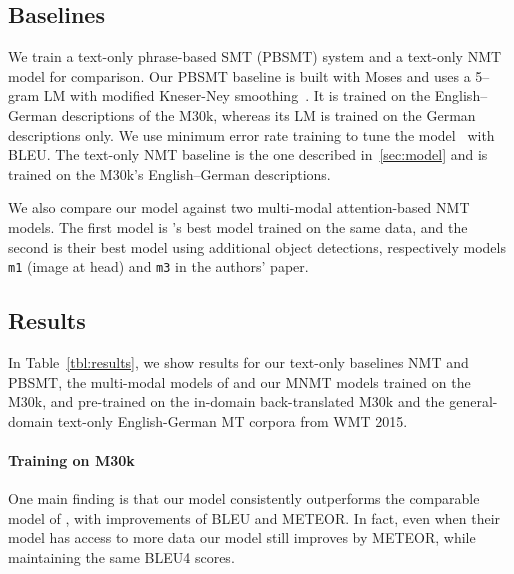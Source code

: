 \documentclass[11pt]{article}
\begin{document}
\subsection{Baselines}\label{sec:baselines}

We train a text-only phrase-based SMT (PBSMT) system and a text-only NMT model for comparison.
Our PBSMT baseline is built with Moses and uses a 5--gram LM with modified Kneser-Ney smoothing~\cite{KneserNey1995}.
It is trained on the English--German descriptions of the M30k, whereas its LM is trained on the German descriptions only.
We use minimum error rate training to tune the model~\cite{Och2003} with BLEU.
The text-only NMT baseline is the one described in~\cref{sec:model} and is trained on the M30k's English--German descriptions.

We also compare our model against two multi-modal attention-based NMT models.
The first model is 's best model trained on the same data, and the second is their best model using additional object detections, respectively models \texttt{m1} (image at head) and \texttt{m3} in the authors' paper.



\subsection{Results}
\label{sec:results}

In Table~\ref{tbl:results}, we show results for our text-only baselines NMT and PBSMT, the multi-modal models of  and our MNMT models trained on the M30k, and pre-trained on the in-domain back-translated M30k and the general-domain text-only English-German MT corpora from WMT 2015.


\paragraph{Training on M30k}

One main finding is that our model consistently outperforms the comparable model of , with improvements of  BLEU and  METEOR.
In fact, even when their model has access to more data our model still improves by  METEOR, while maintaining the same BLEU4 scores.
\end{document}
